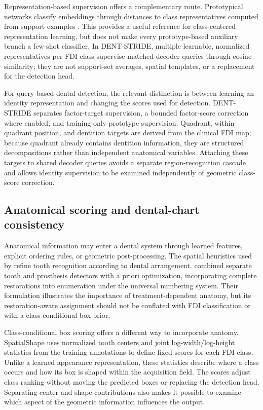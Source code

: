 \documentclass[a4paper,fleqn]{cas-dc}
\begin{document}
Representation-based supervision offers a complementary route. Prototypical networks classify embeddings through distances to class representatives computed from support examples \citep{snell2017prototypical}. This provides a useful reference for class-centered representation learning, but does not make every prototype-based auxiliary branch a few-shot classifier. In DENT-STRIDE, multiple learnable, normalized representatives per FDI class supervise matched decoder queries through cosine similarity; they are not support-set averages, spatial templates, or a replacement for the detection head.

For query-based dental detection, the relevant distinction is between learning an identity representation and changing the scores used for detection. DENT-STRIDE separates factor-target supervision, a bounded factor-score correction where enabled, and training-only prototype supervision. Quadrant, within-quadrant position, and dentition targets are derived from the clinical FDI map; because quadrant already contains dentition information, they are structured decompositions rather than independent anatomical variables. Attaching these targets to shared decoder queries avoids a separate region-recognition cascade and allows identity supervision to be examined independently of geometric class-score correction.

\subsection{Anatomical scoring and dental-chart consistency}

Anatomical information may enter a dental system through learned features, explicit ordering rules, or geometric post-processing. The spatial heuristics used by \citet{tuzoff2019tooth} refine tooth recognition according to dental arrangement. \citet{ali2023teeth} combined separate tooth and prosthesis detectors with a priori optimization, incorporating complete restorations into enumeration under the universal numbering system. Their formulation illustrates the importance of treatment-dependent anatomy, but its restoration-aware assignment should not be conflated with FDI classification or with a class-conditional box prior.

Class-conditional box scoring offers a different way to incorporate anatomy. SpatialShape uses normalized tooth centers and joint log-width/log-height statistics from the training annotations to define fixed scores for each FDI class. Unlike a learned appearance representation, these statistics describe where a class occurs and how its box is shaped within the acquisition field. The scores adjust class ranking without moving the predicted boxes or replacing the detection head. Separating center and shape contributions also makes it possible to examine which aspect of the geometric information influences the output.
\end{document}
